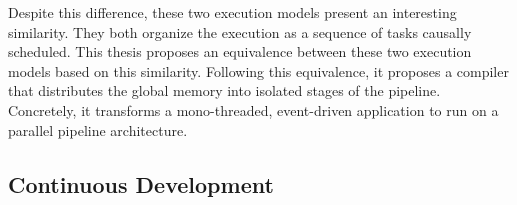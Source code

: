 \begin{figure}[h!]
  \centering{}
\end{figure}

Despite this difference, these two execution models present an interesting similarity.
They both organize the execution as a sequence of tasks causally scheduled. %
This thesis proposes an equivalence between these two execution models based on this similarity.
Following this equivalence, it proposes a compiler that distributes the global memory into isolated stages of the pipeline.
Concretely, it transforms a mono-threaded, event-driven application to run on a parallel pipeline architecture.

\subsection{Continuous Development}

